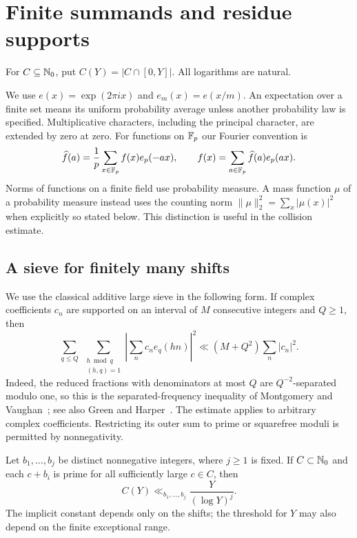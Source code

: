 \section{Finite summands and residue supports}\label{sec:preliminaries}

For $C\subseteq\mathbb N_0$, put $C(Y)=|C\cap[0,Y]|$.
All logarithms are natural.

We use $e(x)=\exp(2\pi i x)$ and $e_m(x)=e(x/m)$.
An expectation over a finite set means its uniform probability average
unless another probability law is specified. Multiplicative characters,
including the principal character, are extended by zero at zero.
For functions on $\mathbb F_p$ our Fourier convention is
\[
 \widehat f(a)=\frac1p\sum_{x\in\mathbb F_p}f(x)e_p(-ax),
 \qquad
 f(x)=\sum_{a\in\mathbb F_p}\widehat f(a)e_p(ax).
\]
Norms of functions on a finite field use probability measure. A mass
function $\mu$ of a probability measure instead uses the counting norm
$\|\mu\|_2^2=\sum_x|\mu(x)|^2$ when explicitly so stated below.
This distinction is useful in the collision estimate.

\subsection{A sieve for finitely many shifts}

We use the classical additive large sieve in the following form.
If complex coefficients $c_n$ are supported on an interval of $M$
consecutive integers and $Q\ge1$, then
\begin{equation}\label{eq:prelim-large-sieve}
 \sum_{q\le Q}\ \sum_{\substack{h\bmod q\\(h,q)=1}}
 \left|\sum_n c_n e_q(hn)\right|^2
 \ll (M+Q^2)\sum_n|c_n|^2.
\end{equation}
Indeed, the reduced fractions with denominators at most $Q$ are
$Q^{-2}$-separated modulo one, so this is the separated-frequency
inequality of Montgomery and Vaughan~\cite[Theorem~1]{MontgomeryVaughan1973};
see also Green and Harper~\cite[Proposition~3.1]{GreenHarper}.
The estimate applies to arbitrary complex coefficients. Restricting its
outer sum to prime or squarefree moduli is permitted by nonnegativity.

\begin{lemma}\label{lem:shifted-sieve}
Let $b_1,\ldots,b_j$ be distinct nonnegative integers, where $j\ge1$ is fixed.
If $C\subset\mathbb N_0$ and each $c+b_i$ is prime for all sufficiently large
$c\in C$, then
\[
 C(Y)\ll_{b_1,\ldots,b_j} \frac{Y}{(\log Y)^j}.
\]
The implicit constant depends only on the shifts; the threshold for $Y$
may also depend on the finite exceptional range.
\end{lemma}

